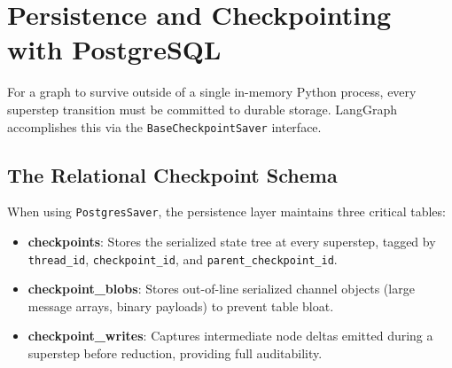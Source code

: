 \section{Persistence and Checkpointing with PostgreSQL}

For a graph to survive outside of a single in-memory Python process, every superstep transition must be committed to durable storage. LangGraph accomplishes this via the \texttt{BaseCheckpointSaver} interface.

\subsection{The Relational Checkpoint Schema}

When using \texttt{PostgresSaver}, the persistence layer maintains three critical tables:
\begin{itemize}[leftmargin=18pt]
  \item \textbf{checkpoints}: Stores the serialized state tree at every superstep, tagged by \texttt{thread\_id}, \texttt{checkpoint\_id}, and \texttt{parent\_checkpoint\_id}.
  \item \textbf{checkpoint\_blobs}: Stores out-of-line serialized channel objects (large message arrays, binary payloads) to prevent table bloat.
  \item \textbf{checkpoint\_writes}: Captures intermediate node deltas emitted during a superstep before reduction, providing full auditability.
\end{itemize}


